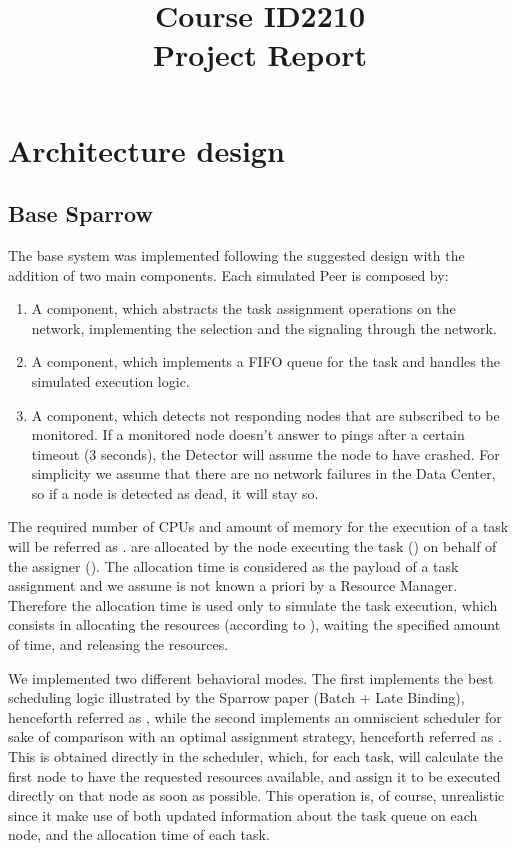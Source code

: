\documentclass[conference]{IEEEtran}
\title{
  Course ID2210\\
  Project Report
}
\author{
  \IEEEauthorblockN{Riccardo Reale}
  \IEEEauthorblockA{Peerialism AB\\
    {riccardo.reale@peerialism.com}\\
    \url{https://github.com/riccardoreale/id2210-vt14.git}
  }
  \and
  \IEEEauthorblockN{Giovanni Simoni}
  \IEEEauthorblockA{Peerialism AB\\
    {giovanni.simoni@peerialism.com}\\
    \url{https://github.com/dacav/id2210-vt14.git}
  }
}
\begin{document}
\maketitle

\section{Architecture design}

  \subsection{Base Sparrow}

  The base system was implemented following the suggested design with the
  addition of two main components. Each simulated Peer is composed by:
  \begin{enumerate}

  \item A \ResourceManager component, which abstracts the task assignment
    operations on the network, implementing the selection and the
    signaling through the network.

  \item A \RmWorker component, which implements a FIFO queue for the task and
    handles the simulated execution logic.

  \item A \FailureDetector component, which detects not
    responding nodes that are subscribed to be monitored. If a monitored
    node doesn't answer to pings after a certain timeout (3 seconds),
    the Detector will assume the node to have crashed. For simplicity we
    assume that there are no network failures in the Data Center, so if a
    node is detected as dead, it will stay so.

  \end{enumerate}

  The required number of CPUs and amount of memory for the execution of a
  task will be referred as \treq. \Treq are allocated by the node
  executing the task (\exc) on behalf of the assigner (\tmast). The
  allocation time is considered as the payload of a task assignment and
  we assume is not known a priori by a Resource Manager. Therefore the
  allocation time is used only to simulate the task execution, which
  consists in allocating the resources (according to \treq), waiting the
  specified amount of time, and releasing the resources.

  We implemented two different behavioral modes. The first implements the
  best scheduling logic illustrated by the Sparrow paper (Batch + Late
  Binding), henceforth referred as \us, while the second implements an
  omniscient scheduler for sake of comparison with an optimal assignment
  strategy, henceforth referred as \omni. This is obtained directly in the
  \dc scheduler, which, for each task, will calculate the first
  node to have the requested resources available, and assign it to be
  executed directly on that node as soon as possible. This operation is,
  of course, unrealistic since it make use of both updated information
  about the task queue on each node, and the allocation time of each task.
\end{document}
